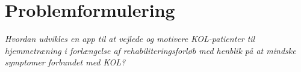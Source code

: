 \section{Problemformulering}
\textit{Hvordan udvikles en app til at vejlede og motivere KOL-patienter til hjemmetræning i forlængelse af rehabiliteringsforløb med henblik på at mindske symptomer forbundet med KOL? }